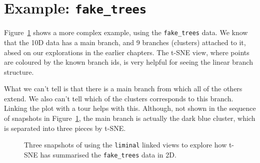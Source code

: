 \documentclass[
  letterpaper,
]{krantz}
\newenvironment{Shaded}{\begin{snugshade}}{\end{snugshade}}
\newcommand{\AttributeTok}[1]{\textcolor[rgb]{0.40,0.45,0.13}{#1}}
\newcommand{\DecValTok}[1]{\textcolor[rgb]{0.68,0.00,0.00}{#1}}
\newcommand{\FunctionTok}[1]{\textcolor[rgb]{0.28,0.35,0.67}{#1}}
\newcommand{\NormalTok}[1]{\textcolor[rgb]{0.00,0.23,0.31}{#1}}
\newcommand{\OtherTok}[1]{\textcolor[rgb]{0.00,0.23,0.31}{#1}}
\newcommand{\SpecialCharTok}[1]{\textcolor[rgb]{0.37,0.37,0.37}{#1}}
\newcommand{\StringTok}[1]{\textcolor[rgb]{0.13,0.47,0.30}{#1}}
\begin{document}
\hypertarget{example-fake_trees}{%
\section{\texorpdfstring{Example:
\texttt{fake\_trees}}{Example: fake\_trees}}\label{example-fake_trees}}

Figure~\ref{fig-liminal-trees} shows a more complex example, using the
\texttt{fake\_trees} data. We know that the 10D data has a main branch,
and 9 branches (clusters) attached to it, absed on our explorations in
the earlier chapters. The t-SNE view, where points are coloured by the
known branch ids, is very helpful for seeing the linear branch
structure.

What we can't tell is that there is a main branch from which all of the
others extend. We also can't tell which of the clusters corresponds to
this branch. Linking the plot with a tour helps with this. Although, not
shown in the sequence of snapshots in Figure~\ref{fig-liminal-trees},
the main branch is actually the dark blue cluster, which is separated
into three pieces by t-SNE.

\begin{Shaded}
\end{Shaded}

\begin{figure}

{\centering 

}

\caption{\label{fig-liminal-trees}Three snapshots of using the
\texttt{liminal} linked views to explore how t-SNE has summarised the
\texttt{fake\_trees} data in 2D.}

\end{figure}
\end{document}
